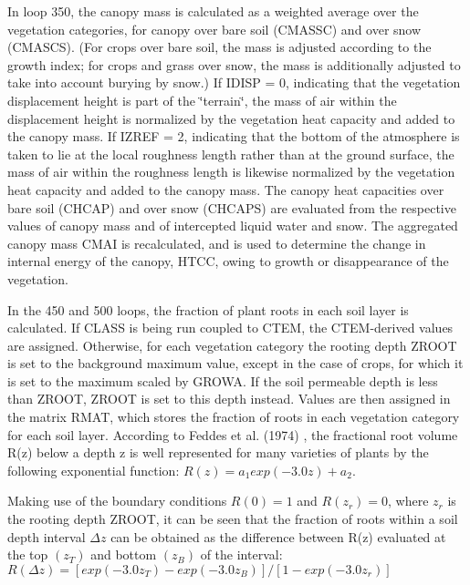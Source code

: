 In loop 350, the canopy mass is calculated as a weighted average over the vegetation categories, for canopy over bare soil (C\+M\+A\+S\+S\+C) and over snow (C\+M\+A\+S\+C\+S). (For crops over bare soil, the mass is adjusted according to the growth index; for crops and grass over snow, the mass is additionally adjusted to take into account burying by snow.) If I\+D\+I\+S\+P = 0, indicating that the vegetation displacement height is part of the \char`\"{}terrain\char`\"{}, the mass of air within the displacement height is normalized by the vegetation heat capacity and added to the canopy mass. If I\+Z\+R\+E\+F = 2, indicating that the bottom of the atmosphere is taken to lie at the local roughness length rather than at the ground surface, the mass of air within the roughness length is likewise normalized by the vegetation heat capacity and added to the canopy mass. The canopy heat capacities over bare soil (C\+H\+C\+A\+P) and over snow (C\+H\+C\+A\+P\+S) are evaluated from the respective values of canopy mass and of intercepted liquid water and snow. The aggregated canopy mass C\+M\+A\+I is recalculated, and is used to determine the change in internal energy of the canopy, H\+T\+C\+C, owing to growth or disappearance of the vegetation.

In the 450 and 500 loops, the fraction of plant roots in each soil layer is calculated. If C\+L\+A\+S\+S is being run coupled to C\+T\+E\+M, the C\+T\+E\+M-\/derived values are assigned. Otherwise, for each vegetation category the rooting depth Z\+R\+O\+O\+T is set to the background maximum value, except in the case of crops, for which it is set to the maximum scaled by G\+R\+O\+W\+A. If the soil permeable depth is less than Z\+R\+O\+O\+T, Z\+R\+O\+O\+T is set to this depth instead. Values are then assigned in the matrix R\+M\+A\+T, which stores the fraction of roots in each vegetation category for each soil layer. According to Feddes et al. (1974) \cite{Feddes1974-ff} , the fractional root volume R(z) below a depth z is well represented for many varieties of plants by the following exponential function\+: $R(z) = a_1 exp(-3.0z) + a_2.$

Making use of the boundary conditions $R(0) = 1$ and $R(z_r ) = 0$, where $z_r$ is the rooting depth Z\+R\+O\+O\+T, it can be seen that the fraction of roots within a soil depth interval $\Delta z$ can be obtained as the difference between R(z) evaluated at the top $(z_T)$ and bottom $(z_B)$ of the interval\+: $R(\Delta z) = [exp(-3.0z_T) - exp(-3.0z_B)]/ [1 - exp(-3.0z_r)]$

